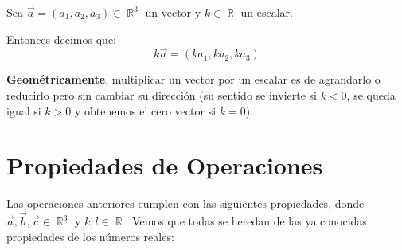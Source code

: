 \documentclass[12pt, fleqn]{report}                             %
\DeclareMathOperator \Reals        {\mathbb{R}}                 %
\begin{document}
                Sea $\vec{a}=(a_1, a_2, a_3) \in \Reals^3$ un vector y $k \in \Reals$ un escalar.
                
                Entonces decimos que:
                \begin{equation*}
                    k\vec{a} = (ka_1, ka_2, ka_3)
                \end{equation*}

                \textbf{Geométricamente}, multiplicar un vector por un escalar es de agrandarlo o reducirlo pero
                sin cambiar su dirección (su sentido se invierte si $k < 0$, se queda igual si $k > 0$ y
                obtenemos el cero vector si $k = 0$).


        \clearpage
        \section{Propiedades de Operaciones}
        
            Las operaciones anteriores cumplen con las siguientes propiedades, donde
            $\vec{a},\vec{b}, \vec{c} \in \Reals^3$ y $k,l \in \Reals$.
            Vemos que todas se heredan de las ya conocidas propiedades de los números reales:
\end{document}
